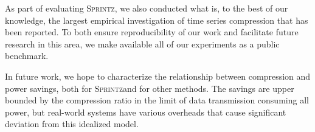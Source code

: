 \documentclass[acmlarge]{acmart}
\newcommand{\mine}{\textsc{Sprintz}}
\newcommand{\minesp}{\textsc{Sprintz}\text{ }}
\begin{document}
As part of evaluating \mine, we also conducted what is, to the best of our knowledge, the largest empirical investigation of time series compression that has been reported. To both ensure reproducibility of our work and facilitate future research in this area, we make available all of our experiments as a public benchmark.

In future work, we hope to characterize the relationship between compression and power savings, both for \minesp and for other methods. The savings are upper bounded by the compression ratio in the limit of data transmission consuming all power, but real-world systems have various overheads that cause significant deviation from this idealized model.


% 



\balance
\end{document}
